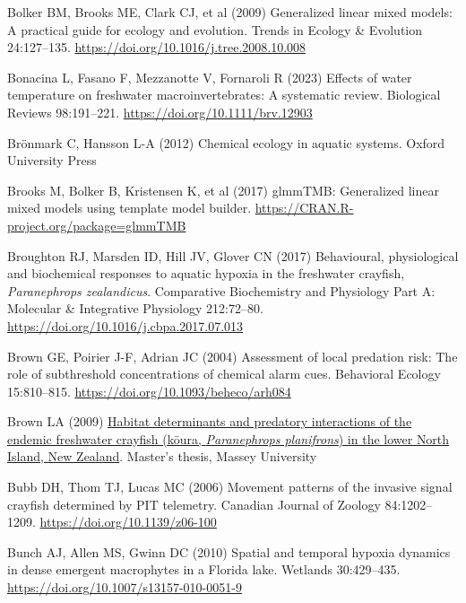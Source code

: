 \documentclass[
  12pt,
  a4paper,
  oneside]{scrbook}
\newlength{\cslhangindent}
\newenvironment{CSLReferences}[2] %
 {\begin{list}{}{%
  \setlength{\itemindent}{0pt}
  \setlength{\leftmargin}{0pt}
  \setlength{\parsep}{0pt}
  \ifodd #1
   \setlength{\leftmargin}{\cslhangindent}
   \setlength{\itemindent}{-1\cslhangindent}
  \fi
  \setlength{\itemsep}{#2\baselineskip}}}
 {\end{list}}
\renewenvironment{CSLReferences}[2]
   {\begin{list}{}{%
    \setlength{\itemindent}{0pt}
    \setlength{\leftmargin}{0pt}
    \setlength{\parsep}{0pt}
    \ifodd #1
     \setlength{\leftmargin}{\cslhangindent}
     \setlength{\itemindent}{-1\cslhangindent}
    \fi
    \setlength{\itemsep}{0.3\baselineskip}}}
   {\end{list}}%
\begin{document}
\begin{CSLReferences}{1}{1}
Bolker BM, Brooks ME, Clark CJ, et al (2009) Generalized linear mixed
models: A practical guide for ecology and evolution. Trends in Ecology
\& Evolution 24:127--135.
\url{https://doi.org/10.1016/j.tree.2008.10.008}

Bonacina L, Fasano F, Mezzanotte V, Fornaroli R (2023) Effects of water
temperature on freshwater macroinvertebrates: A systematic review.
Biological Reviews 98:191--221. \url{https://doi.org/10.1111/brv.12903}

Brönmark C, Hansson L-A (2012) Chemical ecology in aquatic systems.
Oxford University Press

Brooks M, Bolker B, Kristensen K, et al (2017) {glmmTMB}: Generalized
linear mixed models using template model builder.
\url{https://CRAN.R-project.org/package=glmmTMB}

Broughton RJ, Marsden ID, Hill JV, Glover CN (2017) Behavioural,
physiological and biochemical responses to aquatic hypoxia in the
freshwater crayfish, {\emph{Paranephrops zealandicus}}. Comparative
Biochemistry and Physiology Part A: Molecular \& Integrative Physiology
212:72--80. \url{https://doi.org/10.1016/j.cbpa.2017.07.013}

Brown GE, Poirier J-F, Adrian JC (2004) Assessment of local predation
risk: The role of subthreshold concentrations of chemical alarm cues.
Behavioral Ecology 15:810--815.
\url{https://doi.org/10.1093/beheco/arh084}

Brown LA (2009) \href{http://hdl.handle.net/10179/1168}{Habitat
determinants and predatory interactions of the endemic freshwater
crayfish (kōura, {\emph{Paranephrops planifrons}}) in the lower {North
Island}, {New Zealand}}. Master's thesis, Massey University

Bubb DH, Thom TJ, Lucas MC (2006) Movement patterns of the invasive
signal crayfish determined by {PIT} telemetry. Canadian Journal of
Zoology 84:1202--1209. \url{https://doi.org/10.1139/z06-100}

Bunch AJ, Allen MS, Gwinn DC (2010) Spatial and temporal hypoxia
dynamics in dense emergent macrophytes in a {Florida} lake. Wetlands
30:429--435. \url{https://doi.org/10.1007/s13157-010-0051-9}


\end{CSLReferences}
\end{document}
